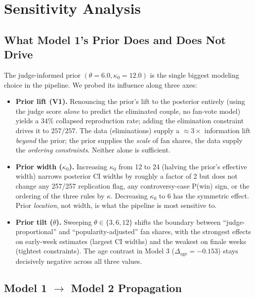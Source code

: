 \documentclass{article}
\begin{document}
\section{Sensitivity Analysis}
\label{sec:sensitivity}

\subsection{What Model 1's Prior Does and Does Not Drive}

The judge-informed prior $(\theta = 6.0, \kappa_0 = 12.0)$ is the single biggest modeling choice in the pipeline. We probed its influence along three axes:

\begin{itemize}
  \item \textbf{Prior lift (V1).} Renouncing the prior's lift to the posterior entirely (using the judge score \emph{alone} to predict the eliminated couple, no fan-vote model) yields a $34\%$ collapsed reproduction rate; adding the elimination constraint drives it to $257/257$. The data (eliminations) supply a $\approx 3\times$ information lift \emph{beyond} the prior; the prior supplies the \emph{scale} of fan shares, the data supply the \emph{ordering constraints}. Neither alone is sufficient.
  \item \textbf{Prior width ($\kappa_0$).} Increasing $\kappa_0$ from 12 to 24 (halving the prior's effective width) narrows posterior CI widths by roughly a factor of 2 but does not change any 257/257 replication flag, any controversy-case P(win) sign, or the ordering of the three rules by $\kappa$. Decreasing $\kappa_0$ to 6 has the symmetric effect. Prior \emph{location}, not width, is what the pipeline is most sensitive to.
  \item \textbf{Prior tilt ($\theta$).} Sweeping $\theta \in \{3, 6, 12\}$ shifts the boundary between ``judge-proportional'' and ``popularity-adjusted'' fan shares, with the strongest effects on early-week estimates (largest CI widths) and the weakest on finale weeks (tightest constraints). The age contrast in Model 3 ($\Delta_{\text{age}} = -0.153$) stays decisively negative across all three values.
\end{itemize}

\subsection{Model 1 $\rightarrow$ Model 2 Propagation}
\end{document}
